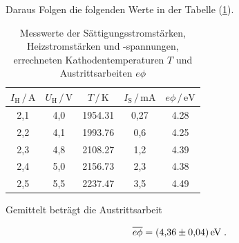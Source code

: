 Daraus Folgen die folgenden Werte in der Tabelle (\ref{tab:mess3}).

\begin{table}
    \centering
    \caption{Messwerte der Sättigungsstromstärken, Heizstromstärken und -spannungen, errechneten
            Kathodentemperaturen $T$ und Austrittsarbeiten $e\phi$}
    \label{tab:mess3}
    \begin{tabular}{c c c c c}
    \toprule
    $I_\text{H} \,/\, \si{\ampere} $ & $U_\text{H} \,/\, \si{\volt}$ & $T \,/\, \si{\kelvin}$
    & $I_\text{S} \,/\, \si{\milli\ampere} $ & $e\phi \,/\, \si{\eV} $\\
    \midrule 
      2,1 & 4,0 & 1954.31 & 0,27& 4.28 \\
      2,2 & 4,1 & 1993.76 & 0,6 & 4.25 \\
      2,3 & 4,8 & 2108.27 & 1,2 & 4.39 \\
      2,4 & 5,0 & 2156.73 & 2,3 & 4.38 \\
      2,5 & 5,5 & 2237.47 & 3,5 & 4.49  \\
    \bottomrule
    \end{tabular}
    \end{table}
  
 Gemittelt beträgt die Austrittsarbeit
  
  \begin{equation*}
      \overline{e\phi} = \SI{4.36 +- 0.04}{\eV} \; .
  \end{equation*}